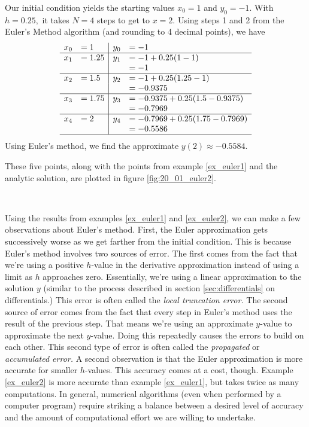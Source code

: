 {Our initial condition yields the starting values $x_0 = 1$ and $y_0 = -1$.  With $h = 0.25,$ it takes $N=4$ steps to get to $x=2.$  Using steps 1 and 2 from the Euler's Method algorithm (and rounding to 4 decimal points), we have
\[
\begin{array}{rl | rl}
x_0  &= 1			& 	y_0	&= -1\\ \hline
x_1 	&= 1.25		&	y_1 	&= -1 + 0.25(1 - 1)\\
	&			&		&= -1\\ \hline
x_2 	&= 1.5 		& 	y_2 	&= -1 + 0.25(1.25-1)\\
	&			&		&= -0.9375\\ \hline
x_3	&= 1.75		&	y_3 	&= -0.9375 + 0.25(1.5-0.9375)\\
	&			&		&= -0.7969\\ \hline
x_4	&= 2			&	y_4	&= -0.7969 + 0.25(1.75 - 0.7969)\\
	&			&		&= -0.5586\\ \hline
\end{array}
\]
Using Euler's method, we find the approximate $y(2) \approx -0.5584.$

These five points, along with the points from example \ref{ex_euler1} and the analytic solution, are plotted in figure \ref{fig:20_01_euler2}.
}\\


Using the results from examples \ref{ex_euler1} and \ref{ex_euler2}, we can make a few observations about Euler's method.  First, the Euler approximation gets successively worse as we get farther from the initial condition.  This is because Euler's method involves two sources of error.  The first comes from the fact that we're using a positive $h$-value in the derivative approximation instead of using a limit as $h$ approaches zero.  Essentially, we're using a linear approximation to the solution $y$ (similar to the process described in section \ref{sec:differentials} on differentials.) This error is often called the \emph{local truncation error.}  The second source of error comes from the fact that every step in Euler's method uses the result of the previous step.  That means we're using an approximate $y$-value to approximate the next $y$-value.  Doing this repeatedly causes the errors to build on each other.  This second type of error is often called the \emph{propagated} or \emph{accumulated error.} A second observation is that the Euler approximation is more accurate for smaller $h$-values.  This accuracy comes at a cost, though.  Example \ref{ex_euler2} is more accurate than example \ref{ex_euler1}, but takes twice as many computations.  In general, numerical algorithms (even when performed by a computer program) require striking a balance between a desired level of accuracy and the amount of computational effort we are willing to undertake.

